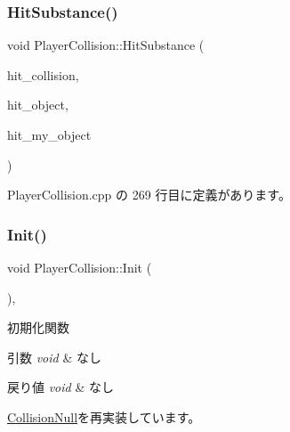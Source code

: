 \subsubsection{\texorpdfstring{Hit\+Substance()}{HitSubstance()}}
{\footnotesize\ttfamily void Player\+Collision\+::\+Hit\+Substance (\begin{DoxyParamCaption}\item[{\mbox{\hyperlink{class_collision_base}{Collision\+Base}} $\ast$}]{hit\+\_\+collision,  }\item[{\mbox{\hyperlink{class_collision_object}{Collision\+Object}} $\ast$}]{hit\+\_\+object,  }\item[{\mbox{\hyperlink{class_collision_object}{Collision\+Object}} $\ast$}]{hit\+\_\+my\+\_\+object }\end{DoxyParamCaption})\hspace{0.3cm}{\ttfamily [private]}}



 Player\+Collision.\+cpp の 269 行目に定義があります。

\mbox{\label{class_player_collision_a3dd6238b75933fd60aee77e92353cc44}} 
\subsubsection{\texorpdfstring{Init()}{Init()}}
{\footnotesize\ttfamily void Player\+Collision\+::\+Init (\begin{DoxyParamCaption}{ }\end{DoxyParamCaption})\hspace{0.3cm}{\ttfamily [override]}, {\ttfamily [virtual]}}



初期化関数 


\begin{DoxyParams}{引数}
{\em void} & なし \\
\hline
\end{DoxyParams}

\begin{DoxyRetVals}{戻り値}
{\em void} & なし \\
\hline
\end{DoxyRetVals}


\mbox{\hyperlink{class_collision_null_af5db1d080c1c0c5a1199062850d8a2ff}{Collision\+Null}}を再実装しています。



